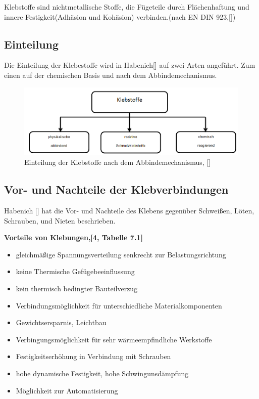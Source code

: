 Klebstoffe sind nichtmetallische Stoffe, die Fügeteile durch Flächenhaftung und innere Festigkeit(Adhäsion und Kohäsion) verbinden.(nach EN DIN 923,[])


\subsection{Einteilung}

Die Einteilung der Klebestoffe wird in Habenich[] auf zwei Arten angeführt. Zum einen auf der chemischen Basis und nach dem Abbindemechanismus. 
\begin{figure}[h]
\begin{center}
\includegraphics[scale =0.6]{Verbindungsmittel/kleber/einteilungderklebstoffe.png}
\caption{ Einteilung der Klebstoffe nach dem Abbindemechanismus, []}
\label{Einteilung der Kelbstoffe}
\end{center}
\end{figure}


\subsection{Vor- und Nachteile der Klebverbindungen}

Habenich [] hat die Vor- und Nachteile des Klebens gegenüber Schweißen, Löten, Schrauben, und Nieten beschrieben. 
\newline{}

\textbf{Vorteile von Klebungen,[4, Tabelle 7.1]}
\begin{itemize}
	\item gleichmäßige Spannungsverteilung senkrecht zur Belastungsrichtung 
	\item keine Thermische Gefügebeeinflussung
	\item kein thermisch bedingter Bauteilverzug
	\item Verbindungsmöglichkeit für unterschiedliche Materialkomponenten
	\item Gewichtsersparnis, Leichtbau
	\item Verbingungsmöglichkeit für sehr wärmeempfindliche Werkstoffe
	\item Festigkeitserhöhung in Verbindung mit Schrauben
	\item hohe dynamische Festigkeit, hohe Schwingunsdämpfung
	\item Möglichkeit zur Automatisierung
\end{itemize}


